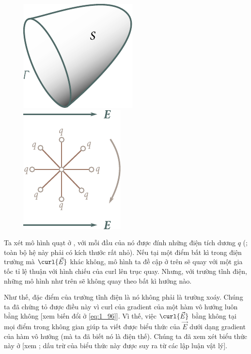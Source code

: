 \begin{figure}[!htb]
	\begin{minipage}[t]{0.5\linewidth}
		\begin{center}
			\includegraphics[scale=0.95]{figures/ch_01/fig_1_32.pdf}
			\caption[]{}
			\label{fig:1_32}
		\end{center}
	\end{minipage}
	\hspace{-0.1cm}
	\begin{minipage}[t]{0.5\linewidth}
		\begin{center}
			\includegraphics[scale=0.95]{figures/ch_01/fig_1_33.pdf}
			\caption[]{}
			\label{fig:1_33}
		\end{center}
	\end{minipage}
\vspace{-0.4cm}
\end{figure}

Ta xét mô hình quạt ở , với mỗi đầu của nó được đính những điện tích dương $q$ (; toàn bộ hệ này phải có kích thước rất nhỏ). Nếu tại một điểm bất kì trong điện trường mà $\curl{\vec{E}}$ khác không, mô hình ta đề cập ở trên sẽ quay với một gia tốc tỉ lệ thuận với hình chiếu của curl lên trục quay. Nhưng, với trường tĩnh điện, những mô hình như trên sẽ không quay theo bất kì hướng nào.

Như thế, đặc điểm của trường tĩnh điện là nó không phải là trường xoáy. Chúng ta đã chứng tỏ được điều này vì curl của gradient của một hàm vô hướng luôn bằng không [xem biến đổi ở \eqref{eq:1_96}]. Vì thế, việc $\curl{\vec{E}}$ bằng không tại mọi điểm trong không gian giúp ta viết được biểu thức của $\vec{E}$ dưới dạng gradient của hàm vô hướng (mà ta đã biết nó là điện thế). Chúng ta đã xem xét biểu thức này ở  [xem ; dấu trừ của biểu thức này được suy ra từ các lập luận vật lý]. 

